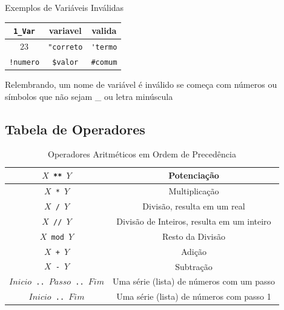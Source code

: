 
\begin{frame}[fragile]
	
	\begin{exampleblock}{Exemplos de Variáveis Inválidas}
		
		\begin{center}
			\begin{tabular}{|c|c|c|}\hline
				\verb!1_Var! & variavel & valida\\ \hline
				$23$ & \verb!"correto! & \verb!'termo!\\ \hline
				\verb+!numero+ & \verb!$valor! & \verb!#comum!\\ \hline
			\end{tabular}
		\end{center}
		
		Relembrando, um nome de variável é inválido se começa com números ou símbolos que não sejam 
		\_ ou letra minúscula
		
	\end{exampleblock}
	
\end{frame}


\subsection{Tabela de Operadores} 
\begin{frame}[fragile]
	
	\begin{table}
		\caption{\label{Operadores Aritméticos}Operadores Aritméticos em Ordem de Precedência}
		\begin{center}
			\begin{tabular}{ c|c } \hline
				\texttt{$X$ ** $Y$}  &  Potenciação \\ \hline 
				\texttt{$X$ * $Y$} &    Multiplicação \\ \hline 
				\texttt{$X$ / $Y$} &    Divisão, resulta em um real \\ \hline 
				\texttt{$X$ // $Y$} &    Divisão de Inteiros, resulta em um inteiro \\ \hline 
				\texttt{$X$ mod $Y$} &   Resto da Divisão\\ \hline
				\texttt{$X$ + $Y$} & Adição \\ \hline 
				\texttt{$X$ - $Y$} &   Subtração \\ \hline 
				{\tt $Inicio$ \verb!..! $Passo$ \verb!..! $Fim$} & Uma série (lista) de números com um passo\\ 
				\hline 
				{\tt $Inicio$ \verb!..! $Fim$}  &   Uma série (lista) de números com passo 1 \\ \hline
			\end{tabular}
		\end{center}
	\end{table}
	
\end{frame}


